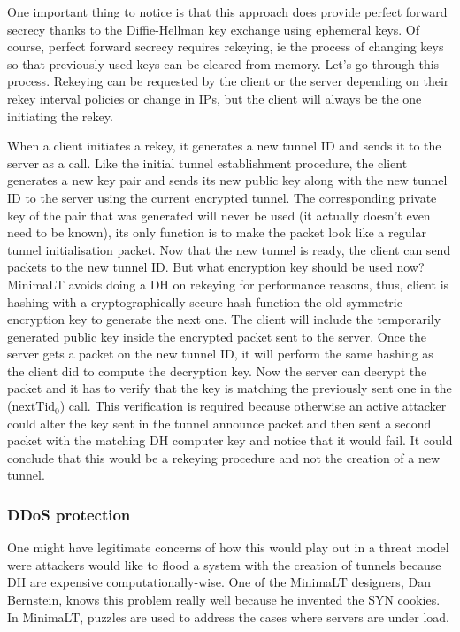 \documentclass{vldb}
\begin{document}
One important thing to notice is that this approach does provide perfect forward secrecy thanks to the Diffie-Hellman key exchange using ephemeral keys. Of course, perfect forward secrecy requires rekeying, ie the process of changing keys so that previously used keys can be cleared from memory. Let's go through this process. Rekeying can be requested by the client or the server depending on their rekey interval policies or change in IPs, but the client will always be the one initiating the rekey.

When a client initiates a rekey, it generates a new tunnel ID and sends it to the server as a call. Like the initial tunnel establishment procedure, the client generates a new key pair and sends its new public key along with the new tunnel ID to the server using the current encrypted tunnel. The corresponding private key of the pair that was generated will never be used (it actually doesn't even need to be known), its only function is to make the packet look like a regular tunnel initialisation packet. Now that the new tunnel is ready, the client can send packets to the new tunnel ID. But what encryption key should be used now? MinimaLT avoids doing a DH on rekeying for performance reasons, thus, client is hashing with a cryptographically secure hash function the old symmetric encryption key to generate the next one. The client will include the temporarily generated public key inside the encrypted packet sent to the server. Once the server gets a packet on the new tunnel ID, it will perform the same hashing as the client did to compute the decryption key. Now the server can decrypt the packet and it has to verify that the key is matching the previously sent one in the (\emph{$\text{nextTid}_{0}$}) call. This verification is required\cite{MinimaLT} because otherwise an active attacker could alter the key sent in the tunnel announce packet and then sent a second packet with the matching DH computer key and notice that it would fail. It could conclude that this would be a rekeying procedure and not the creation of a new tunnel.


\subsubsection{DDoS protection}

One might have legitimate concerns of how this would play out in a threat model were attackers would like to flood a system with the creation of tunnels because DH are expensive computationally-wise. One of the MinimaLT designers, Dan Bernstein, knows this problem really well because he invented the SYN cookies. In MinimaLT, puzzles are used to address the cases where servers are under load.
\end{document}
